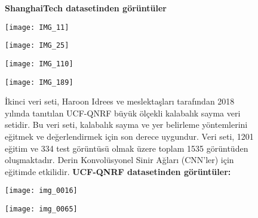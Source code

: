 \documentclass[10pt,a4paper]{report}
\begin{document}
\begin{justify}
\begin{landscape}
	
		\begin{figure}[!h] %
			\raggedright	\textbf{ShanghaiTech datasetinden görüntüler}\newline
			
			\begin{minipage}[t]{0.450\linewidth}
				\centering
				\texttt{[image: IMG\_11]}
				\caption{\cite{thien2016shanghaitech}}
			\end{minipage}\hfill
			\begin{minipage}[t]{0.450\linewidth}
				\centering
				\texttt{[image: IMG\_25]}
				\caption{\cite{thien2016shanghaitech}}
			\end{minipage}
			
			
			
			\begin{minipage}[b]{0.450\linewidth}
				\centering
				\texttt{[image: IMG\_110]}
				\caption{\cite{thien2016shanghaitech}}
			\end{minipage}\hfill
			\begin{minipage}[b]{0.450\linewidth}
				\centering
				\texttt{[image: IMG\_189]}
				\caption{\cite{thien2016shanghaitech}}
			\end{minipage}
			
	\end{figure}
		
	\end{landscape}
	\clearpage
\begin{landscape} %
	
	
	\begin{figure}[!h] %
		\begin{justify}
				İkinci veri seti, Haroon Idrees ve meslektaşları tarafından 2018 yılında tanıtılan UCF-QNRF büyük ölçekli kalabalık sayma veri setidir. Bu veri seti, kalabalık sayma ve yer belirleme yöntemlerini eğitmek ve değerlendirmek için son derece uygundur. Veri seti, 1201 eğitim ve 334 test görüntüsü olmak üzere toplam 1535 görüntüden oluşmaktadır. Derin Konvolüsyonel Sinir Ağları (CNN'ler) için eğitimde etkilidir\cite{idrees2018composition}.\newline
			\textbf{UCF-QNRF datasetinden görüntüler:}
		\end{justify}

		
		\begin{minipage}[t]{0.395\linewidth}
			\centering
			\texttt{[image: img\_0016]}
			\caption{\cite{idrees2018composition}}
		\end{minipage}\hfill
		\begin{minipage}[t]{0.395\linewidth}
			\centering
			\texttt{[image: img\_0065]}
			\caption{\cite{idrees2018composition}}
		\end{minipage}
		

\end{figure}
\end{landscape}
\end{justify}
\end{document}
